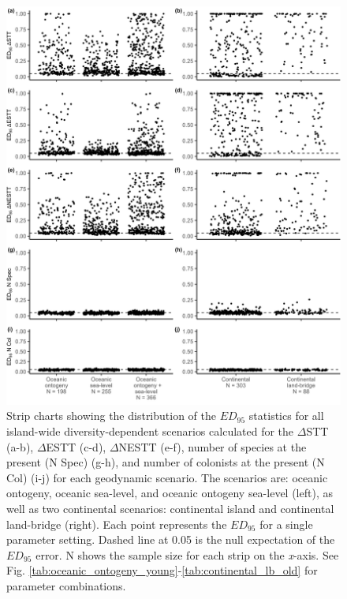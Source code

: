 \begin{figure}
    \centering
    \includegraphics[width=\textwidth]{JBI-21-0508_FigS5.png}
    \caption{Strip charts showing the distribution of the $ED_{95}$ statistics for all island-wide diversity-dependent scenarios calculated for the $\Delta$STT (a-b), $\Delta$ESTT (c-d), $\Delta$NESTT (e-f), number of species at the present (N Spec) (g-h), and number of colonists at the present (N Col) (i-j) for each geodynamic scenario. The scenarios are: oceanic ontogeny, oceanic sea-level, and oceanic ontogeny sea-level (left), as well as two continental scenarios: continental island and continental land-bridge (right). Each point represents the $ED_{95}$ for a single parameter setting. Dashed line at 0.05 is the null expectation of the $ED_{95}$ error. N shows the sample size for each strip on the \textit{x}-axis. See Fig. \ref{tab:oceanic_ontogeny_young}-\ref{tab:continental_lb_old} for parameter combinations.}
    \label{fig:facet_scenario_iw}
\end{figure}


